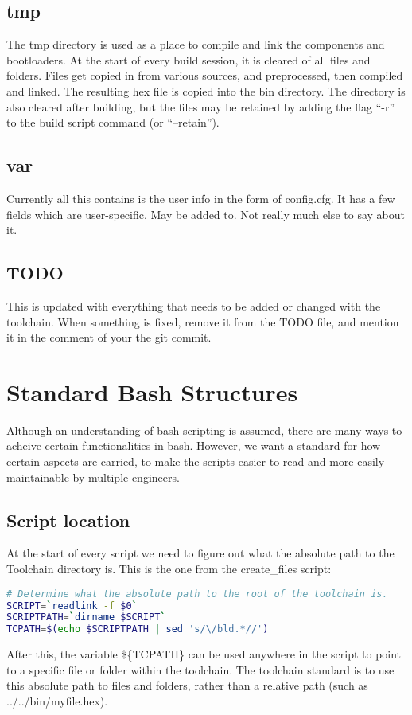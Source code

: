 \documentclass[a4paper, oneside, 11pt, titlepage, onecolumn, openright]{report}
\begin{document}
\section{tmp}
			\label{s:tmp}
			The tmp directory is used as a place to compile and link the components and bootloaders. At the start of every build session, it is cleared of all files and folders. Files get copied in from various sources, and preprocessed, then compiled and linked. The resulting hex file is copied into the bin directory. 
			The directory is also cleared after building, but the files may be retained by adding the flag ``-r'' to the build script command (or ``--retain'').
			
\section{var}
			\label{s:var}
			Currently all this contains is the user info in the form of config.cfg. It has a few fields which are user-specific. May be added to. Not really much else to say about it.
			
\section{TODO}
			\label{s:TODO}
			This is updated with everything that needs to be added or changed with the toolchain. When something is fixed, remove it from the TODO file, and mention it in the comment of your the git commit.
\pagebreak			
\chapter{Standard Bash Structures}
			\label{C:BashStructures}
			Although an understanding of bash scripting is assumed, there are many ways to acheive certain functionalities in bash. However, we want a standard for how certain aspects are carried, to make the scripts easier to read and more easily maintainable by multiple engineers.
			
\section{Script location}
			\label{s:ScriptLocation}
			At the start of every script we need to figure out what the absolute path to the Toolchain directory is. This is the one from the create\_files script:
			
\begin{lstlisting}[frame=trBL, breaklines=true, language = bash]
# Determine what the absolute path to the root of the toolchain is.
SCRIPT=`readlink -f $0`
SCRIPTPATH=`dirname $SCRIPT`
TCPATH=$(echo $SCRIPTPATH | sed 's/\/bld.*//')
\end{lstlisting}
After this, the variable \$\{TCPATH\} can be used anywhere in the script to point to a specific file or folder within the toolchain. The toolchain standard is to use this absolute path to files and folders, rather than a relative path (such as ../../bin/myfile.hex).
			
\end{document}
